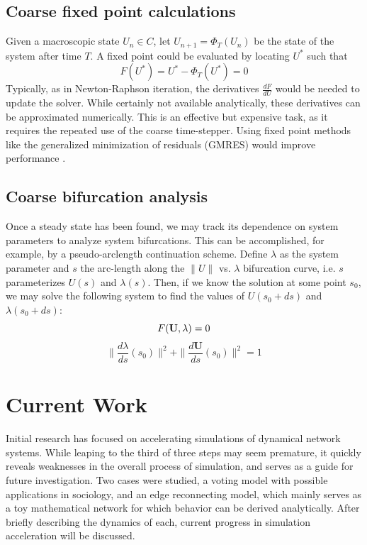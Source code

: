 \documentclass[11pt]{article}
\begin{document}
\subsection{Coarse fixed point calculations}
\indent Given a macroscopic state $U_{n} \in C$, let $U_{n+1} = \Phi_{T}(U_{n})$ be the state of the system after time $T$. A fixed point could be evaluated by locating $U^{*}$ such that 
\[
F(U^{*}) = U^{*} - \Phi_{T}(U^{*}) = 0
\]
Typically, as in Newton-Raphson iteration, the derivatives $\frac{dF}{dU}$ would be needed to update the solver. While certainly not available analytically, these derivatives can be approximated numerically. This is an effective but expensive task, as it requires the repeated use of the coarse time-stepper. Using fixed point methods like the generalized minimization of residuals (GMRES) would improve performance \cite{Saad1986}.
\subsection{Coarse bifurcation analysis}
Once a steady state has been found, we may track its dependence on system parameters to analyze system bifurcations. This can be accomplished, for example, by a pseudo-arclength continuation scheme. Define $\lambda$ as the system parameter and $s$ the arc-length along the $\|U\|$ vs. $\lambda$ bifurcation curve, i.e. $s$ parameterizes $U(s)$ and $\lambda(s)$. Then, if we know the solution at some point $s_{0}$, we may solve the following system to find the values of $U(s_{0}+ds)$ and $\lambda(s_{0}+ds)$:
\[
F(\textbf{U}, \lambda) = 0 \\
\]
\[
\| \frac{d \lambda}{ds}(s_{0}) \|^{2} + \| \frac{d \textbf{U}}{ds}(s_{0}) \|^{2} = 1
\]
\section{Current Work}
\label{sec:CW}
\indent Initial research has focused on accelerating simulations of dynamical network systems. While leaping to the third of three steps may seem premature, it quickly reveals weaknesses in the overall process of simulation, and serves as a guide for future investigation. Two cases were studied, a voting model with possible applications in sociology, and an edge reconnecting model, which mainly serves as a toy mathematical network for which behavior can be derived analytically. After briefly describing the dynamics of each, current progress in simulation acceleration will be discussed.
\end{document}
